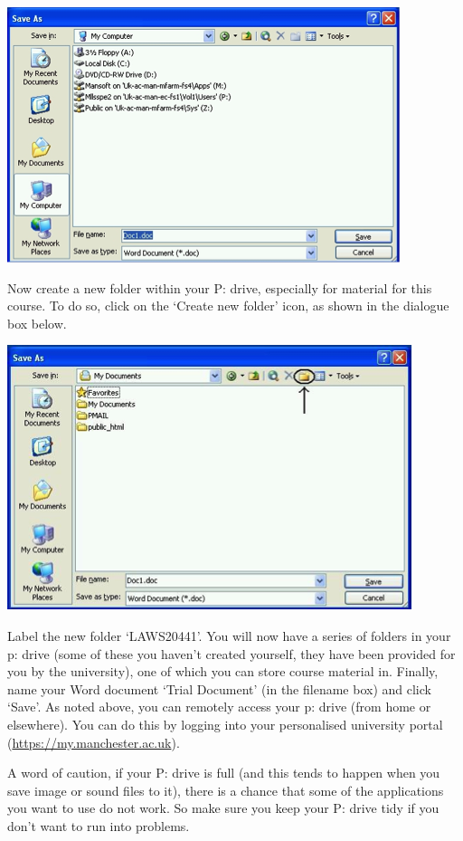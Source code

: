 \documentclass[]{book}
\theoremstyle{definition}
\theoremstyle{definition}
\theoremstyle{definition}
\theoremstyle{remark}
\begin{document}
\includegraphics{imgs/save_doc_as.png}

 Now create a new folder within your P: drive, especially for material
for this course. To do so, click on the `Create new folder' icon, as
shown in the dialogue box below.

\includegraphics{imgs/create_folder.png}

{ Label the new folder `LAWS20441'. You will now have a series of
folders in your p: drive (some of these you haven't created yourself,
they have been provided for you by the university), one of which you can
store course material in. Finally, name your Word document `Trial
Document' (in the filename box) and click `Save'. As noted above, you
can remotely access your p: drive (from home or elsewhere). You can do
this by logging into your personalised university portal
(\url{https://my.manchester.ac.uk}). }

A word of caution, if your P: drive is full (and this tends to happen
when you save image or sound files to it), there is a chance that some
of the applications you want to use do not work. So make sure you keep
your P: drive tidy if you don't want to run into problems.
\end{document}
